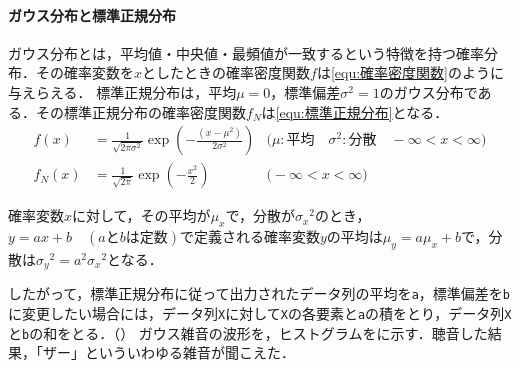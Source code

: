 \paragraph{ガウス分布と標準正規分布}ガウス分布とは，平均値・中央値・最頻値が一致するという特徴を持つ確率分布．その確率変数を\(x\)としたときの確率密度関数\(f\)は\eqref{equ:確率密度関数}のように与えらえる．
標準正規分布は，平均\(\mu=0\)，標準偏差\(\sigma^2=1\)のガウス分布である．その標準正規分布の確率密度関数\(f_N\)は\eqref{equ:標準正規分布}となる．
\begin{align}
    f(x)   & = \frac{1}{\sqrt{2\pi\sigma^2}}\exp\left(-\frac{(x-\mu^2)}{2\sigma^2}\right) & \big(\mu:\textrm{平均}\quad\sigma^2:\textrm{分散}\quad-\infty<x<\infty\big)\label{equ:確率密度関数} \\
    f_N(x) & =\frac{1}{\sqrt{2\pi}}\exp\left(-\frac{x^2}{2}\right)                        & \big(-\infty<x<\infty\big)\label{equ:標準正規分布}
\end{align}
\begin{leftbar}
    確率変数\(x\)に対して，その平均が\(\mu_x\)で，分散が\({\sigma_x}^2\)のとき，\(y=ax+b\quad(a\textrm{と}b\textrm{は定数})\)で定義される確率変数\(y\)の平均は\(\mu_y=a\mu_x+b\)で，分散は\({\sigma_y}^2=a^2{\sigma_x}^2\)となる．\hfill\cite{matlab}
\end{leftbar}
したがって，標準正規分布に従って出力されたデータ列の平均を\texttt{a}，標準偏差を\texttt{b}に変更したい場合には，データ列\texttt{X}に対して\texttt{X}の各要素と\texttt{a}の積をとり，データ列\texttt{X}と\texttt{b}の和をとる．（）
\result
ガウス雑音の波形を，ヒストグラムをに示す．聴音した結果，「ザー」といういわゆる雑音が聞こえた．
